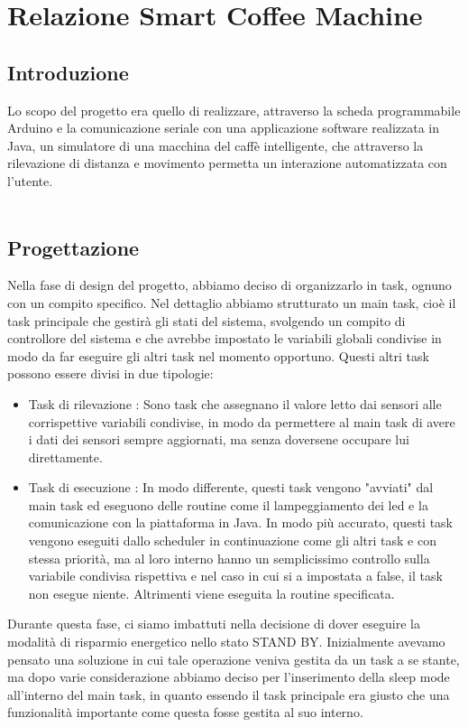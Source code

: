 \documentclass[a4paper]{article}
\begin{document}
\section*{Relazione Smart Coffee Machine} 
\subsection*{Introduzione}
Lo scopo del progetto era quello di realizzare, attraverso la scheda programmabile Arduino e la comunicazione seriale con una applicazione software realizzata in Java, un simulatore di una macchina del caffè intelligente, che attraverso la rilevazione di distanza e movimento permetta un interazione automatizzata con l'utente.
\\
\\
\subsection*{Progettazione}
Nella fase di design del progetto, abbiamo deciso di organizzarlo in task, ognuno con un compito specifico. Nel dettaglio abbiamo strutturato un main task, cioè il task principale che gestirà gli stati del sistema, svolgendo un compito di controllore del sistema e che avrebbe impostato le variabili globali condivise in modo da far eseguire gli altri task nel momento opportuno.
Questi altri task possono essere divisi in due tipologie:
\begin{itemize}
\item {Task di rilevazione }:
Sono task che assegnano il valore letto dai sensori alle corrispettive variabili condivise, in modo da permettere al main task di avere i dati dei sensori sempre aggiornati, ma senza doversene occupare lui direttamente.


\item {Task di esecuzione }:
In modo differente, questi task vengono "avviati" dal main task ed eseguono delle routine come il lampeggiamento dei led e la comunicazione con la piattaforma in Java.
In modo più accurato, questi task vengono eseguiti dallo scheduler in continuazione come gli altri task e con stessa priorità, ma al loro interno hanno un semplicissimo controllo sulla variabile condivisa rispettiva e nel caso in cui si
a impostata a false, il task non esegue niente. Altrimenti viene eseguita la routine specificata.

\end{itemize}
Durante questa fase, ci siamo imbattuti nella decisione di dover eseguire la modalità di risparmio energetico nello stato STAND BY. Inizialmente avevamo pensato una soluzione in cui tale operazione veniva gestita da un task a se stante, ma dopo varie considerazione abbiamo deciso per l'inserimento della sleep mode all'interno del main task, in quanto essendo il task principale era giusto che una funzionalità importante come questa fosse gestita al suo interno. 
\end{document}
